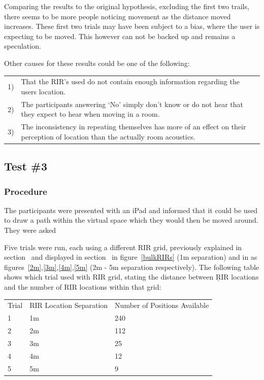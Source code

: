 \documentclass[../../main.tex]{subfiles}
\begin{document}
				Comparing the results to the original hypothesis, excluding the first two trails, there seems to be more people noticing movement as the distance moved increases. These first two trials may have been subject to a bias, where the user is expecting to be moved. This however can not be backed up and remains a speculation.

				Other causes for these results could be one of the following:

				\begin{tabular}{l p{}}
				1) & That the \ac{RIR}'s used do not contain enough information regarding the users location. \\
				2) & The participants answering `No' simply don't know or do not hear that they expect to hear when moving in a room.\\
				3) & The inconsistency in repeating themselves has more of an effect on their perception of location than the actually room acoustics.
				\end{tabular}


		\subsection{Test \#3}

			\subsubsection{Procedure}
				The participants were presented with an iPad and informed that it could be used to draw a path within the virtual space which they would then be moved around. They were asked 

				Five trials were run, each using a different \ac{RIR} grid, previously explained in section~ and displayed in section~  in figure~\ref{bulkRIRs} (1m separation) and in  as figures~\ref{2m},\ref{3m},\ref{4m},\ref{5m} (2m - 5m separation respectively). The following table shows which trial used with \ac{RIR} grid, stating the distance between \c{RIR} locations and the number of \ac{RIR} locations within that grid:

				\begin{center}
					\begin{tabu} to 0.9\textwidth{X[1,c] X[2,c] X[2,c]}
					Trial & \ac{RIR} Location Separation & Number of Positions Available \\
						1 & 1m & 240 \\
						2 & 2m & 112 \\
						3 & 3m & 25 \\
						4 & 4m & 12 \\
						5 & 5m & 9 \\
					\end{tabu}
				\end{center}
\end{document}
